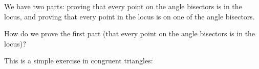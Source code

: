 

We have two parts: proving that every point on the angle bisectors is in the locus, and proving that every point in the locus is on one of the angle bisectors.

How do we prove the first part (that every point on the angle bisectors is in the locus)?









This is a simple exercise in congruent triangles:




